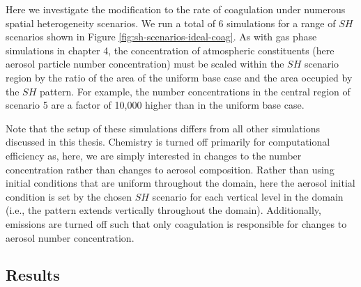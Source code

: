 Here we investigate the modification to the rate of coagulation under numerous spatial heterogeneity scenarios. We run a total of 6 simulations for a range of $SH$ scenarios shown in Figure \ref{fig:sh-scenarios-ideal-coag}. As with gas phase simulations in chapter 4, the concentration of atmospheric constituents (here aerosol particle number concentration) must be scaled within the $SH$ scenario region by the ratio of the area of the uniform base case and the area occupied by the $SH$ pattern. For example, the number concentrations in the central region of scenario 5 are a factor of 10,000 higher than in the uniform base case. 

Note that the setup of these simulations differs from all other simulations discussed in this thesis. Chemistry is turned off primarily for computational efficiency as, here, we are simply interested in changes to the number concentration rather than changes to aerosol composition. Rather than using initial conditions that are uniform throughout the domain, here the aerosol initial condition is set by the chosen $SH$ scenario for each vertical level in the domain (i.e., the pattern extends vertically throughout the domain). Additionally, emissions are turned off such that only coagulation is responsible for changes to aerosol number concentration.

\subsection{Results}

